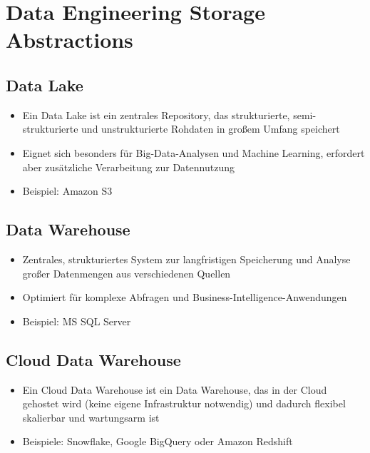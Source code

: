 \documentclass[11pt]{scrartcl}
\begin{document}
\tableofcontents 

\newpage
\section{Data Engineering Storage Abstractions}
\subsection{Data Lake}
\begin{itemize}
	\item Ein Data Lake ist ein zentrales Repository, das strukturierte, semi-strukturierte und unstrukturierte Rohdaten in großem Umfang speichert
	\item Eignet sich besonders für Big-Data-Analysen und Machine Learning, erfordert aber zusätzliche Verarbeitung zur Datennutzung
	\item Beispiel: Amazon S3
\end{itemize}


\subsection{Data Warehouse}
\begin{itemize}
	\item Zentrales, strukturiertes System zur langfristigen Speicherung und Analyse großer Datenmengen aus verschiedenen Quellen
	\item Optimiert für komplexe Abfragen und Business-Intelligence-Anwendungen
	\item Beispiel: MS SQL Server
\end{itemize}


\subsection{Cloud Data Warehouse}
\begin{itemize}
	\item Ein Cloud Data Warehouse ist ein Data Warehouse, das in der Cloud gehostet wird (keine eigene Infrastruktur notwendig) und dadurch flexibel skalierbar und wartungsarm ist
	\item Beispiele: Snowflake, Google BigQuery oder Amazon Redshift
\end{itemize}
\end{document}
